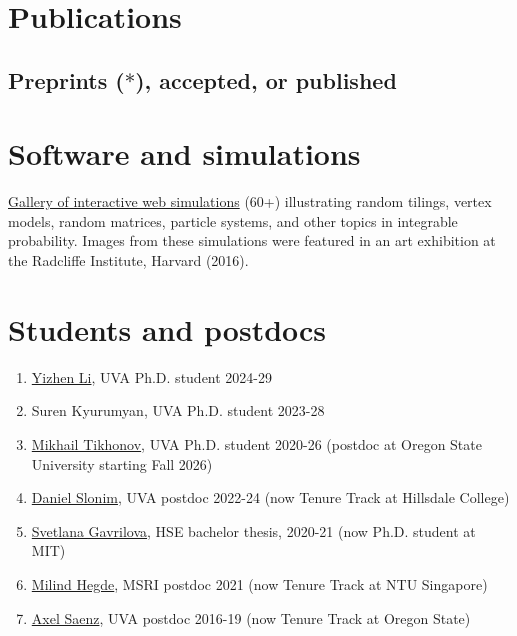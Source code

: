 \documentclass[letterpaper,11pt]{article}
\begin{document}
\section*{Publications}

\subsection*{Preprints ($*$), accepted, or published}



\section*{Software and simulations}

\href{https://lpetrov.cc/simulations/}{Gallery of interactive web simulations}
(60+) illustrating random tilings, vertex models, random matrices, particle systems, and other topics in integrable probability.
Images from these simulations were featured in an art exhibition at the Radcliffe Institute, Harvard (2016).

\section*{Students and postdocs}

\begin{enumerate}
    \item \href{https://math.virginia.edu/people/smb2tp/}{Yizhen Li}, UVA Ph.D. student 2024-29
    \item Suren Kyurumyan, UVA Ph.D. student 2023-28
    \item \href{https://mtikhonov.com}{Mikhail Tikhonov}, UVA Ph.D. student 2020-26 (postdoc at Oregon State University starting Fall 2026)
    \item \href{https://danielslonim.github.io}{Daniel Slonim}, UVA postdoc 2022-24 (now Tenure Track at Hillsdale College)
    \item \href{https://math.mit.edu/directory/profile.html?pid=2588}{Svetlana Gavrilova},  HSE bachelor thesis, 2020-21 (now Ph.D. student at MIT)
    \item \href{https://milindhegde.github.io/}{Milind Hegde}, MSRI postdoc 2021 (now Tenure Track at NTU Singapore)
    \item \href{https://sites.google.com/view/axelsaenz}{Axel Saenz}, UVA postdoc 2016-19 (now Tenure Track at Oregon State)
\end{enumerate}
\end{document}

